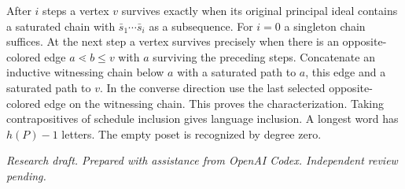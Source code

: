 \documentclass[11pt]{article}
\begin{document}
After $i$ steps a vertex $v$ survives exactly when its original principal ideal contains a saturated chain with $\bar s_1\cdots\bar s_i$ as a subsequence. For $i=0$ a singleton chain suffices. At the next step a vertex survives precisely when there is an opposite-colored edge $a\lessdot b\le v$ with $a$ surviving the preceding steps. Concatenate an inductive witnessing chain below $a$ with a saturated path to $a$, this edge and a saturated path to $v$. In the converse direction use the last selected opposite-colored edge on the witnessing chain. This proves the characterization. Taking contrapositives of schedule inclusion gives language inclusion. A longest word has $h(P)-1$ letters. The empty poset is recognized by degree zero.

\medskip\noindent\textit{Research draft. Prepared with assistance from OpenAI Codex. Independent review pending.}
\end{document}

